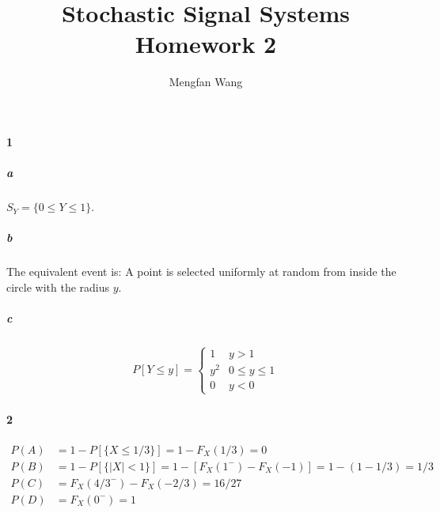 \documentclass[22pt]{article}
\author{Mengfan Wang}
\title{Stochastic Signal Systems Homework 2}
\begin{document}
		\maketitle 
	\paragraph{1}
		\subparagraph{a} $S_Y = \{0\leq Y \leq 1\}$.
		\subparagraph{b} The equivalent event is: A point is selected uniformly at random from inside the circle with the radius $y$.
		\subparagraph{c} \begin{align} 
				 P[Y\leq y] = 
				\begin{cases}
				1 & y>1\\
				y^2 & 0\leq y \leq 1 \\
				0 & y<0
				\end{cases}
		\end{align}

	\paragraph{2}
		\begin{align}
		P(A) & = 1 - P[\{X\leq 1/3\}] = 1 - F_X(1/3) = 0\\
		P(B) & = 1 - P[\{|X|<1\}] = 1 - [F_X(1^{-})-F_X(-1)] = 1 - (1 - 1/3) = 1/3\\
		P(C) & = F_X(4/3^-) - F_X(-2/3) = 16/27\\
		P(D) & = F_X(0^-) = 1
		\end{align}
\end{document}
